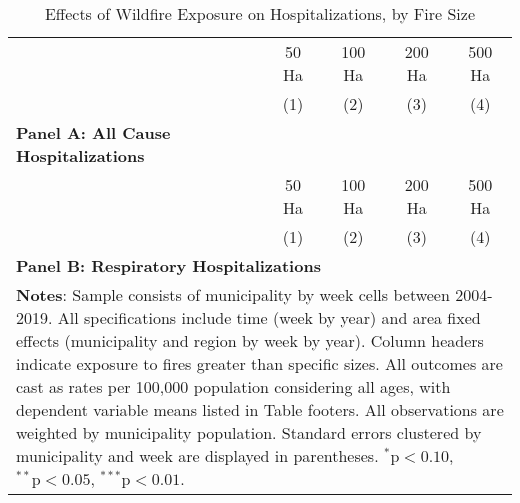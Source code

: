 \documentclass[11pt]{article}
\begin{document}
\begin{spacing}{1.5}
\begin{table}[htpb!]
    \caption{Effects of Wildfire Exposure on Hospitalizations, by Fire Size}
    \label{tab:RFhosp}
    \centering
    \begin{tabular}{lcccc} \\ \toprule
    & 50 Ha & 100 Ha & 200 Ha & 500 Ha \\ 
    & (1) & (2) & (3) & (4) \\ \midrule
    \multicolumn{1}{l}{\textbf{Panel A: All Cause Hospitalizations}}&&&&\\
     
    \midrule 
      & 50 Ha & 100 Ha & 200 Ha & 500 Ha \\ 
    & (1) & (2) & (3) & (4)\\ \midrule
    \multicolumn{5}{l}{\textbf{Panel B: Respiratory Hospitalizations}}\\
     
    \bottomrule
    \multicolumn{5}{p{12.8cm}}{{\footnotesize \textbf{Notes}: Sample consists of municipality by week cells between 2004-2019.  All specifications include time (week by year) and area fixed effects (municipality and region by week by year).  Column headers indicate exposure to fires greater than specific sizes.  All outcomes are cast as rates per 100,000 population considering all ages, with dependent variable means listed in Table footers.  All observations are weighted by municipality population.  Standard errors clustered by municipality and week are displayed in parentheses.   $^{*}\text{p}<0.10$, $^{**}\text{p}<0.05$, $^{***}\text{p}<0.01$.}}
    \end{tabular}
\end{table}


\end{spacing}
\end{document}
